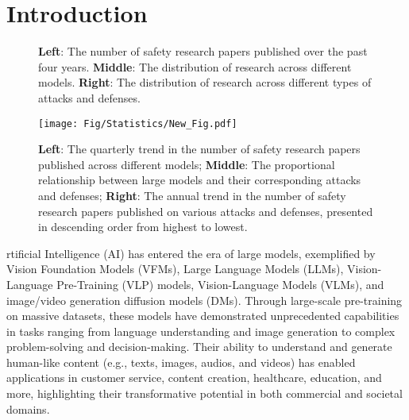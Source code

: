 \section{Introduction}
\label{sec:introduction}

\begin{figure*}[h]
    \centering
    \caption{\textbf{Left}: The number of safety research papers published over the past four years. \textbf{Middle}: The distribution of research across different models. \textbf{Right}: The distribution of research across different types of attacks and defenses.}
    \label{fig:total_num}
\end{figure*}


\begin{figure*}[htb]
\centering
    \texttt{[image: Fig/Statistics/New\_Fig.pdf]}
        \caption{ \textbf{Left}: The quarterly trend in the number of safety research papers published across different models; \textbf{Middle}: The proportional relationship between large models and their corresponding attacks and defenses; \textbf{Right}: The annual trend in the number of safety research papers published on various attacks and defenses, presented in descending order from highest to lowest.}
\label{fig:crossview}
\end{figure*}

rtificial Intelligence (AI) has entered the era of large models, exemplified by Vision Foundation Models (VFMs), Large Language Models (LLMs), Vision-Language Pre-Training (VLP) models, Vision-Language Models (VLMs), and image/video generation diffusion models (DMs).
Through large-scale pre-training on massive datasets, these models have demonstrated unprecedented capabilities in tasks ranging from language understanding and image generation to complex problem-solving and decision-making. Their ability to understand and generate human-like content (e.g., texts, images, audios, and videos) has enabled applications in customer service, content creation, healthcare, education, and more,  highlighting their transformative potential in both commercial and societal domains.

